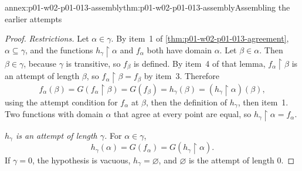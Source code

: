 \begin{annexitem}{annex:p01-w02-p01-013-assembly}{thm:p01-w02-p01-013-assembly}{Assembling the earlier attempts}
\begin{proof}
\emph{Restrictions.} Let \(\alpha\in\gamma\). By item~1 of
\cref{thm:p01-w02-p01-013-agreement}, \(\alpha\subseteq\gamma\), and the
functions \(h_\gamma\mathbin{\upharpoonright}\alpha\) and \(f_\alpha\) both
have domain \(\alpha\). Let \(\beta\in\alpha\). Then \(\beta\in\gamma\),
because \(\gamma\) is transitive, so \(f_\beta\) is defined. By item~4 of
that lemma, \(f_\alpha\mathbin{\upharpoonright}\beta\) is an attempt of
length \(\beta\), so \(f_\alpha\mathbin{\upharpoonright}\beta=f_\beta\) by
item~3. Therefore
\[
  f_\alpha(\beta)=G(f_\alpha\mathbin{\upharpoonright}\beta)=G(f_\beta)
  =h_\gamma(\beta)=(h_\gamma\mathbin{\upharpoonright}\alpha)(\beta),
\]
using the attempt condition for \(f_\alpha\) at \(\beta\), then the
definition of \(h_\gamma\), then item~1. Two functions with domain
\(\alpha\) that agree at every point are equal, so
\(h_\gamma\mathbin{\upharpoonright}\alpha=f_\alpha\).

\emph{\(h_\gamma\) is an attempt of length \(\gamma\).} For
\(\alpha\in\gamma\),
\[
  h_\gamma(\alpha)=G(f_\alpha)=G(h_\gamma\mathbin{\upharpoonright}\alpha).
\]
If \(\gamma=0\), the hypothesis is vacuous, \(h_\gamma=\varnothing\), and
\(\varnothing\) is the attempt of length \(0\).
\end{proof}
\end{annexitem}


